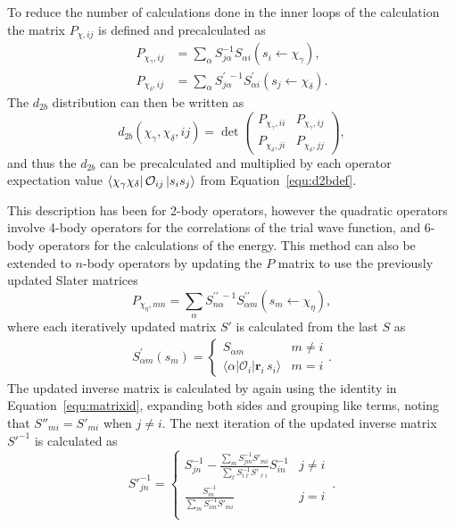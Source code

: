 To reduce the number of calculations done in the inner loops of the calculation the matrix $P_{\chi,ij}$ is defined and precalculated as
\begin{align}
   P_{\chi_\gamma,ij} &=\sum_\alpha S^{-1}_{j\alpha}S_{\alpha i}(s_i\leftarrow \chi_\gamma), \\
   P_{\chi_\delta,ij} &=\sum_\alpha S^{\prime\;-1}_{j\alpha}S^\prime_{\alpha i}(s_j\leftarrow \chi_\delta).
\end{align}
The $d_{2b}$ distribution can then be written as
\begin{equation}
   d_{2b}(\chi_\gamma,\chi_\delta,ij)=\det\begin{pmatrix}P_{\chi_\gamma,ii} & P_{\chi_\gamma,ij} \\ P_{\chi_\delta,ji} & P_{\chi_\delta,jj}\end{pmatrix},
\end{equation}
and thus the $d_{2b}$ can be precalculated and multiplied by each operator expectation value $\left< \chi_\gamma\chi_\delta \right|\mathcal{O}_{ij}\left| s_is_j \right>$ from Equation~\ref{equ:d2bdef}.

This description has been for 2-body operators, however the quadratic operators involve 4-body operators for the correlations of the trial wave function, and 6-body operators for the calculations of the energy. This method can also be extended to $n$-body operators by updating the $P$ matrix to use the previously updated Slater matrices
\begin{equation}
   P_{\chi_\eta,mn}=\sum_\alpha S^{\prime\prime\;-1}_{n\alpha}S^{\prime\prime}_{\alpha m}(s_m\leftarrow \chi_\eta),
\end{equation}
where each iteratively updated matrix $S'$ is calculated from the last $S$ as
\begin{align}
   S^{\prime}_{\alpha m}(s_m) = \left\{
   \begin{array}{cc}
      S_{\alpha m} & m \ne i\\
      \langle\alpha|\mathcal O_i|\mathbf{r}_i\,s_i\rangle  & m = i
   \end{array} .
   \right.
\end{align}
The updated inverse matrix is calculated by again using the identity in Equation~\ref{equ:matrixid}, expanding both sides and grouping like terms, noting that $S''_{mi} = S'_{mi}$ when $j\ne i$. The next iteration of the updated inverse matrix $S'^{-1}$ is calculated as
\begin{equation}
S'^{-1}_{jn} = \left \{
\begin{array}{cc}
S^{-1}_{jn} -\frac{\sum_m S^{-1}_{jm}S'_{mi}}{\sum_\ell S^{-1}_{i\ell}
S'_{\ell i}} S^{-1}_{in}  & j \ne i\\
\frac{S^{-1}_{in}}{\sum_m S^{-1}_{im}S'_{mi}} & j = i\\
\end{array}
\right . \,.
\end{equation}

